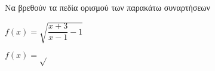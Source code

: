 Να βρεθούν τα πεδία ορισμού των παρακάτω συναρτήσεων
\begin{alist}
\item $ f(x)=\sqrt{\dfrac{x+3}{x-1}-1} $
\item $ f(x)=\sqrt{} $
\end{alist}

